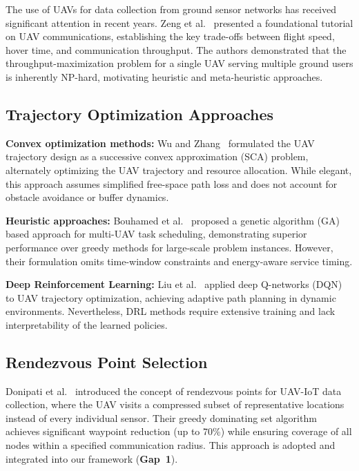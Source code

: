 \documentclass[12pt, a4paper, oneside]{report}
\begin{document}
The use of UAVs for data collection from ground sensor networks has received significant attention in recent years. Zeng et al.~\cite{zeng2019accessing} presented a foundational tutorial on UAV communications, establishing the key trade-offs between flight speed, hover time, and communication throughput. The authors demonstrated that the throughput-maximization problem for a single UAV serving multiple ground users is inherently NP-hard, motivating heuristic and meta-heuristic approaches.

\subsection{Trajectory Optimization Approaches}

\textbf{Convex optimization methods:} Wu and Zhang~\cite{wu2018common} formulated the UAV trajectory design as a successive convex approximation (SCA) problem, alternately optimizing the UAV trajectory and resource allocation. While elegant, this approach assumes simplified free-space path loss and does not account for obstacle avoidance or buffer dynamics.

\textbf{Heuristic approaches:} Bouhamed et al.~\cite{bouhamed2020uav} proposed a genetic algorithm (GA) based approach for multi-UAV task scheduling, demonstrating superior performance over greedy methods for large-scale problem instances. However, their formulation omits time-window constraints and energy-aware service timing.

\textbf{Deep Reinforcement Learning:} Liu et al.~\cite{liu2019energy} applied deep Q-networks (DQN) to UAV trajectory optimization, achieving adaptive path planning in dynamic environments. Nevertheless, DRL methods require extensive training and lack interpretability of the learned policies.

\subsection{Rendezvous Point Selection}

Donipati et al.~\cite{donipati2025tnsm} introduced the concept of rendezvous points for UAV-IoT data collection, where the UAV visits a compressed subset of representative locations instead of every individual sensor. Their greedy dominating set algorithm achieves significant waypoint reduction (up to 70\%) while ensuring coverage of all nodes within a specified communication radius. This approach is adopted and integrated into our framework (\textbf{Gap~1}).
\end{document}
